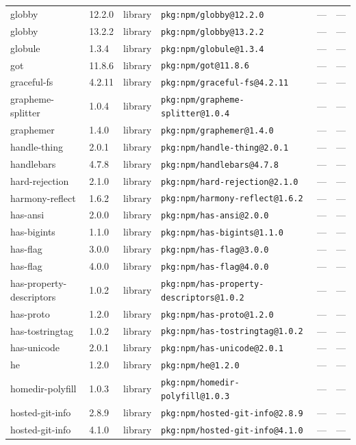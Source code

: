 \documentclass[11pt]{article}
\begin{document}
\begin{longtable}{|l|l|l|p{2.2cm}|l|p{4cm}|}
globby & 12.2.0 & library & \texttt{pkg:npm/globby@12.2.0} & — & — \\
globby & 13.2.2 & library & \texttt{pkg:npm/globby@13.2.2} & — & — \\
globule & 1.3.4 & library & \texttt{pkg:npm/globule@1.3.4} & — & — \\
got & 11.8.6 & library & \texttt{pkg:npm/got@11.8.6} & — & — \\
graceful-fs & 4.2.11 & library & \texttt{pkg:npm/graceful-fs@4.2.11} & — & — \\
grapheme-splitter & 1.0.4 & library & \texttt{pkg:npm/grapheme-splitter@1.0.4} & — & — \\
graphemer & 1.4.0 & library & \texttt{pkg:npm/graphemer@1.4.0} & — & — \\
handle-thing & 2.0.1 & library & \texttt{pkg:npm/handle-thing@2.0.1} & — & — \\
handlebars & 4.7.8 & library & \texttt{pkg:npm/handlebars@4.7.8} & — & — \\
hard-rejection & 2.1.0 & library & \texttt{pkg:npm/hard-rejection@2.1.0} & — & — \\
harmony-reflect & 1.6.2 & library & \texttt{pkg:npm/harmony-reflect@1.6.2} & — & — \\
has-ansi & 2.0.0 & library & \texttt{pkg:npm/has-ansi@2.0.0} & — & — \\
has-bigints & 1.1.0 & library & \texttt{pkg:npm/has-bigints@1.1.0} & — & — \\
has-flag & 3.0.0 & library & \texttt{pkg:npm/has-flag@3.0.0} & — & — \\
has-flag & 4.0.0 & library & \texttt{pkg:npm/has-flag@4.0.0} & — & — \\
has-property-descriptors & 1.0.2 & library & \texttt{pkg:npm/has-property-descriptors@1.0.2} & — & — \\
has-proto & 1.2.0 & library & \texttt{pkg:npm/has-proto@1.2.0} & — & — \\
has-tostringtag & 1.0.2 & library & \texttt{pkg:npm/has-tostringtag@1.0.2} & — & — \\
has-unicode & 2.0.1 & library & \texttt{pkg:npm/has-unicode@2.0.1} & — & — \\
he & 1.2.0 & library & \texttt{pkg:npm/he@1.2.0} & — & — \\
homedir-polyfill & 1.0.3 & library & \texttt{pkg:npm/homedir-polyfill@1.0.3} & — & — \\
hosted-git-info & 2.8.9 & library & \texttt{pkg:npm/hosted-git-info@2.8.9} & — & — \\
hosted-git-info & 4.1.0 & library & \texttt{pkg:npm/hosted-git-info@4.1.0} & — & — \\

\end{longtable}
\end{document}
